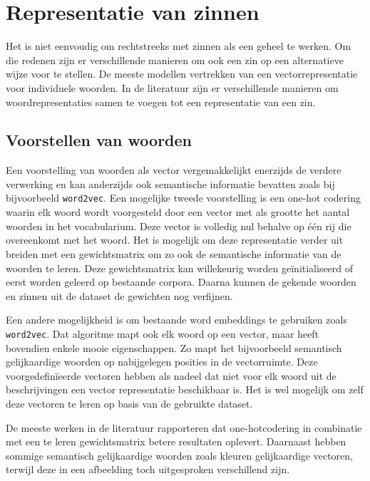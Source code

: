 \section{Representatie van zinnen}
Het is niet eenvoudig om rechtstreeks met zinnen als een geheel te werken. Om die redenen zijn er verschillende manieren om ook een zin op een alternatieve wijze voor te stellen.
De meeste modellen vertrekken van een vectorrepresentatie voor individuele woorden. In de literatuur zijn er verschillende manieren om woordrepresentaties samen te voegen tot een representatie van een zin.

\subsection{Voorstellen van woorden}
 Een voorstelling van woorden als vector vergemakkelijkt enerzijds de verdere verwerking en kan anderzijds ook semantische informatie bevatten zoals bij bijvoorbeeld \texttt{word2vec}\cite{Mikolov2013}. 
 Een mogelijke tweede voorstelling is een one-hot codering waarin elk woord wordt voorgesteld door een vector met als grootte het aantal woorden in het vocabularium. Deze vector is volledig nul behalve op \'e\'en rij die overeenkomt met het woord. Het is mogelijk om deze representatie verder uit breiden met een gewichtsmatrix om zo ook de semantische informatie van de woorden te leren. Deze gewichtsmatrix kan willekeurig worden ge\"initialiseerd of eerst worden geleerd op bestaande corpora\cite{Lebret2013,Mao2014a,Google}. Daarna kunnen de gekende woorden en zinnen uit de dataset de gewichten nog verfijnen.  

 Een andere mogelijkheid is om bestaande word embeddings te gebruiken zoals \texttt{word2vec}. Dat algoritme mapt ook elk woord op een vector, maar heeft bovendien enkele mooie eigenschappen. Zo mapt het bijvoorbeeld semantisch gelijkaardige woorden op nabijgelegen posities in de vectorruimte\cite{Mikolov2013}. Deze voorgedefin\"ieerde vectoren hebben als nadeel dat niet voor elk woord uit de beschrijvingen een vector representatie beschikbaar is. Het is wel mogelijk om zelf deze vectoren te leren op basis van de gebruikte dataset.

 De meeste werken in de literatuur rapporteren dat one-hotcodering in combinatie met een te leren gewichtsmatrix betere resultaten oplevert. Daarnaast hebben sommige semantisch gelijkaardige woorden zoals kleuren gelijkaardige vectoren, terwijl deze in een afbeelding toch uitgesproken verschillend zijn\cite{Karpathy2015}.
 

